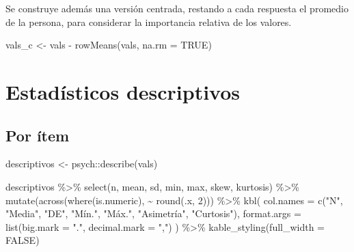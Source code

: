 \documentclass[
  spanish,
  a4paper,
  oneside]{scrbook}
\newenvironment{Shaded}{\begin{snugshade}}{\end{snugshade}}
\newcommand{\AttributeTok}[1]{\textcolor[rgb]{0.40,0.45,0.13}{#1}}
\newcommand{\ConstantTok}[1]{\textcolor[rgb]{0.56,0.35,0.01}{#1}}
\newcommand{\DecValTok}[1]{\textcolor[rgb]{0.68,0.00,0.00}{#1}}
\newcommand{\FunctionTok}[1]{\textcolor[rgb]{0.28,0.35,0.67}{#1}}
\newcommand{\NormalTok}[1]{\textcolor[rgb]{0.00,0.23,0.31}{#1}}
\newcommand{\OtherTok}[1]{\textcolor[rgb]{0.00,0.23,0.31}{#1}}
\newcommand{\SpecialCharTok}[1]{\textcolor[rgb]{0.37,0.37,0.37}{#1}}
\newcommand{\StringTok}[1]{\textcolor[rgb]{0.13,0.47,0.30}{#1}}
\begin{document}
Se construye además una versión centrada, restando a cada respuesta el
promedio de la persona, para considerar la importancia relativa de los
valores.

\begin{Shaded}
\begin{Highlighting}[]
\NormalTok{vals\_c }\OtherTok{\textless{}{-}}\NormalTok{ vals }\SpecialCharTok{{-}} \FunctionTok{rowMeans}\NormalTok{(vals, }\AttributeTok{na.rm =} \ConstantTok{TRUE}\NormalTok{)}
\end{Highlighting}
\end{Shaded}

\chapter{Estadísticos descriptivos}\label{estaduxedsticos-descriptivos}

\section{Por ítem}\label{por-uxedtem}

\begin{Shaded}
\begin{Highlighting}[]
\NormalTok{descriptivos }\OtherTok{\textless{}{-}}\NormalTok{ psych}\SpecialCharTok{::}\FunctionTok{describe}\NormalTok{(vals)}

\NormalTok{descriptivos }\SpecialCharTok{\%\textgreater{}\%}
  \FunctionTok{select}\NormalTok{(n, mean, sd, min, max, skew, kurtosis) }\SpecialCharTok{\%\textgreater{}\%}
  \FunctionTok{mutate}\NormalTok{(}\FunctionTok{across}\NormalTok{(}\FunctionTok{where}\NormalTok{(is.numeric), }\SpecialCharTok{\textasciitilde{}} \FunctionTok{round}\NormalTok{(.x, }\DecValTok{2}\NormalTok{))) }\SpecialCharTok{\%\textgreater{}\%}
  \FunctionTok{kbl}\NormalTok{(}
    \AttributeTok{col.names =} \FunctionTok{c}\NormalTok{(}\StringTok{"N"}\NormalTok{, }\StringTok{"Media"}\NormalTok{, }\StringTok{"DE"}\NormalTok{, }\StringTok{"Mín."}\NormalTok{, }\StringTok{"Máx."}\NormalTok{, }\StringTok{"Asimetría"}\NormalTok{, }\StringTok{"Curtosis"}\NormalTok{),}
    \AttributeTok{format.args =} \FunctionTok{list}\NormalTok{(}\AttributeTok{big.mark =} \StringTok{"."}\NormalTok{, }\AttributeTok{decimal.mark =} \StringTok{","}\NormalTok{)}
\NormalTok{  ) }\SpecialCharTok{\%\textgreater{}\%}
  \FunctionTok{kable\_styling}\NormalTok{(}\AttributeTok{full\_width =} \ConstantTok{FALSE}\NormalTok{)}
\end{Highlighting}
\end{Shaded}
\end{document}
